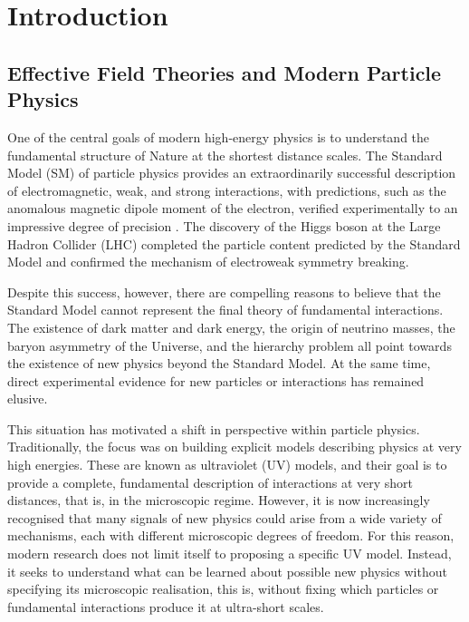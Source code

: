\chapter{Introduction}
\label{ch:introduction}

\section{Effective Field Theories and Modern Particle Physics}

One of the central goals of modern high-energy physics is to understand the fundamental structure of Nature at the shortest distance scales. The Standard Model (SM) of particle physics provides an extraordinarily successful description of electromagnetic, weak, and strong interactions, with predictions, such as the anomalous magnetic dipole moment of the electron, verified experimentally to an impressive degree of precision \autocite{Fan:2022eto}. The discovery of the Higgs boson at the Large Hadron Collider (LHC) completed the particle content predicted by the Standard Model and confirmed the mechanism of electroweak symmetry breaking.

Despite this success, however, there are compelling reasons to believe that the Standard Model cannot represent the final theory of fundamental interactions. The existence of dark matter and dark energy, the origin of neutrino masses, the baryon asymmetry of the Universe, and the hierarchy problem all point towards the existence of new physics beyond the Standard Model. At the same time, direct experimental evidence for new particles or interactions has remained elusive.

This situation has motivated a shift in perspective within particle physics. Traditionally, the focus was on building explicit models describing physics at very high energies. These are known as ultraviolet (UV) models, and their goal is to provide a complete, fundamental description of interactions at very short distances, that is, in the microscopic regime. However, it is now increasingly recognised that many signals of new physics could arise from a wide variety of mechanisms, each with different microscopic degrees of freedom. For this reason, modern research does not limit itself to proposing a specific UV model. Instead, it seeks to understand what can be learned about possible new physics without specifying its microscopic realisation, this is, without fixing which particles or fundamental interactions produce it at ultra-short scales. 

